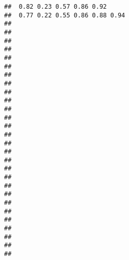 \documentclass[
]{book}
\begin{document}
\begin{verbatim}
##  0.82 0.23 0.57 0.86 0.92                                                            
##  0.77 0.22 0.55 0.86 0.88 0.94                                                       
##                                                                                      
##                                                                                      
##                                                                                      
##                                                                                      
##                                                                                      
##                                                                                      
##                                                                                      
##                                                                                      
##                                                                                      
##                                                                                      
##                                                                                      
##                                                                                      
##                                                                                      
##                                                                                      
##                                                                                      
##                                                                                      
##                                                                                      
##                                                                                      
##                                                                                      
##                                                                                      
##                                                                                      
##                                                                                      
##                                                                                      
##                                                                                      
##                                                                                      
##                                                                                      
##                                                                                      
##                                                                                      

\end{verbatim}
\end{document}
